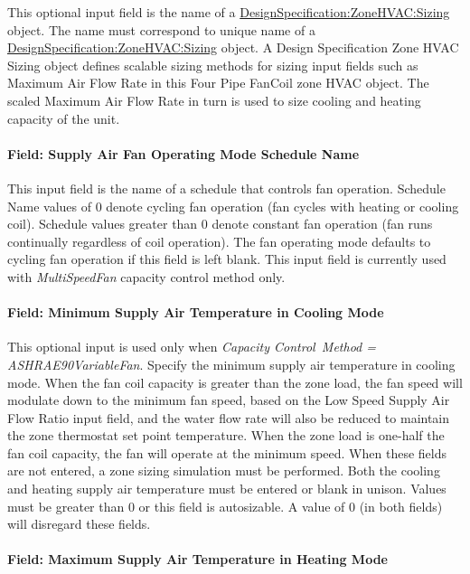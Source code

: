 This optional input field is the name of a \hyperref[designspecificationzonehvacsizing]{DesignSpecification:ZoneHVAC:Sizing} object. The name must correspond to unique name of a \hyperref[designspecificationzonehvacsizing]{DesignSpecification:ZoneHVAC:Sizing} object. A Design Specification Zone HVAC Sizing object defines scalable sizing methods for sizing input fields such as Maximum Air Flow Rate in this Four Pipe FanCoil zone HVAC object. The scaled Maximum Air Flow Rate in turn is used to size cooling and heating capacity of the unit.

\paragraph{Field: Supply Air Fan Operating Mode Schedule Name}\label{field-supply-air-fan-operating-mode-schedule-name-000}

This input field is the name of a schedule that controls fan operation. Schedule Name values of 0 denote cycling fan operation (fan cycles with heating or cooling coil). Schedule values greater than 0 denote constant fan operation (fan runs continually regardless of coil operation). The fan operating mode defaults to cycling fan operation if this field is left blank. This input field is currently used with \emph{MultiSpeedFan} capacity control method only.

\paragraph{Field: Minimum Supply Air Temperature in Cooling Mode}\label{field-minimum-supply-air-temperature-in-cooling-mode}

This optional input is used only when \emph{Capacity Control~Method = ASHRAE90VariableFan}. Specify the minimum supply air temperature in cooling mode. When the fan coil capacity is greater than the zone load, the fan speed will modulate down to the minimum fan speed, based on the Low Speed Supply Air Flow Ratio input field, and the water flow rate will also be reduced to maintain the zone thermostat set point temperature. When the zone load is one-half the fan coil capacity, the fan will operate at the minimum speed. When these fields are not entered, a zone sizing simulation must be performed. Both the cooling and heating supply air temperature must be entered or blank in unison. Values must be greater than 0 or this field is autosizable. A value of 0 (in both fields) will disregard these fields.

\paragraph{Field: Maximum Supply Air Temperature in Heating Mode}\label{field-maximum-supply-air-temperature-in-heating-mode}

